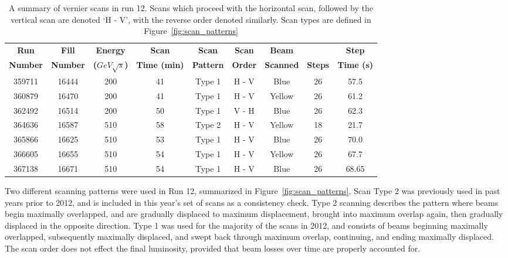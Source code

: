 \begin{table}
\centering
\begin{tabular}{ccccccccc}
\toprule
\textbf{Run}    & \textbf{Fill}   & \textbf{Energy}          & \textbf{Scan}       & \textbf{Scan}    & \textbf{Scan}  & \textbf{Beam}    &                & \textbf{Step}     \\
\textbf{Number} & \textbf{Number} & \textbf{($GeV\sqrt{s}$)} & \textbf{Time (min)} & \textbf{Pattern} & \textbf{Order} & \textbf{Scanned} & \textbf{Steps} & \textbf{Time (s)} \\
\midrule
359711 & 16444 & 200 & 41 & Type 1 & H - V & Blue  & 26 & 57.5 \\
360879 & 16470 & 200 & 41 & Type 1 & H - V & Yellow& 26 & 61.2 \\
362492 & 16514 & 200 & 50 & Type 1 & V - H & Blue  & 26 & 62.3 \\
364636 & 16587 & 510 & 58 & Type 2 & H - V & Yellow& 18 & 21.7 \\
365866 & 16625 & 510 & 53 & Type 1 & H - V & Blue  & 26 & 70.0 \\
366605 & 16655 & 510 & 54 & Type 1 & H - V & Yellow& 26 & 67.7 \\
367138 & 16671 & 510 & 54 & Type 1 & H - V & Blue  & 26 & 68.65\\
\bottomrule
\end{tabular}
\caption{ A summary of vernier scans in run 12. Scans which proceed with the
horizontal scan, followed by the vertical scan are denoted `H - V', with the
reverse order denoted similarly. Scan types are defined in
Figure~\ref{fig:scan_patterns}}
\label{tab:global_scan_summary}
\end{table}

Two different scanning patterns were used in Run 12, summarized in
Figure~\ref{fig:scan_patterns}. Scan Type 2 was previously used in past years
prior to 2012, and is included in this year's set of scans as a consistency
check. Type 2 scanning describes the pattern where beams begin maximally
overlapped, and are gradually displaced to maximum displacement, brought into
maximum overlap again, then gradually displaced in the opposite direction.  Type
1 was used for the majority of the scans in 2012, and consists of beams
beginning maximally overlapped, subsequently maximally displaced, and swept back
through maximum overlap, continuing, and ending maximally displaced. The scan
order does not effect the final luminosity, provided that beam losses over time
are properly accounted for.

